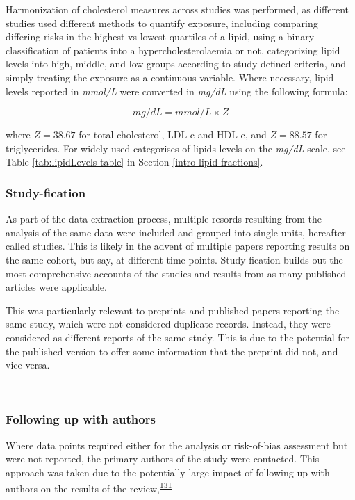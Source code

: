 \documentclass[a4paper, twoside]{templates/ociamthesis}
\begin{document}
Harmonization of cholesterol measures across studies was performed, as different studies used different methods to quantify exposure, including comparing differing risks in the highest vs lowest quartiles of a lipid, using a binary classification of patients into a hypercholesterolaemia or not, categorizing lipid levels into high, middle, and low groups according to study-defined criteria, and simply treating the exposure as a continuous variable. Where necessary, lipid levels reported in \emph{mmol/L} were converted in \emph{mg/dL} using the following formula:

\begin{equation} 
  mg/dL = mmol/L \times{} Z
  \label{eq:lipidConversion}
\end{equation}

where \(Z = 38.67\) for total cholesterol, LDL-c and HDL-c, and \(Z = 88.57\) for triglycerides. For widely-used categorises of lipids levels on the \emph{mg/dL} scale, see Table \ref{tab:lipidLevels-table} in Section \ref{intro-lipid-fractions}.

\hypertarget{study-fication}{%
\subsubsection{Study-fication}\label{study-fication}}

As part of the data extraction process, multiple resords resulting from the analysis of the same data were included and grouped into single units, hereafter called studies. This is likely in the advent of multiple papers reporting results on the same cohort, but say, at different time points. Study-fication builds out the most comprehensive accounts of the studies and results from as many published articles were applicable.

This was particularly relevant to preprints and published papers reporting the same study, which were not considered duplicate records. Instead, they were considered as different reports of the same study. This is due to the potential for the published version to offer some information that the preprint did not, and vice versa.

~

\hypertarget{contacting-authors}{%
\subsubsection{Following up with authors}\label{contacting-authors}}

Where data points required either for the analysis or risk-of-bias assessment but were not reported, the primary authors of the study were contacted. This approach was taken due to the potentially large impact of following up with authors on the results of the review,\textsuperscript{\protect\hyperlink{ref-reynders2019}{131}}
\end{document}
